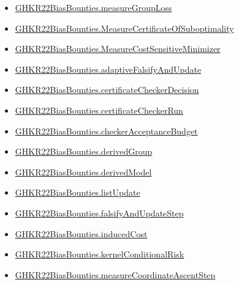 \documentclass[10pt]{article}
\begin{document}
\begin{itemize}[leftmargin=1.2em]
\begin{itemize}[leftmargin=1.2em]
\item \hyperlink{paper-prerequisite-c9cff6ba9100bf1c}{GHKR22\allowbreak{}Bias\allowbreak{}Bounties.\allowbreak{}measure\allowbreak{}Group\allowbreak{}Loss}
\item \hyperlink{paper-prerequisite-ad05480b2c897936}{GHKR22\allowbreak{}Bias\allowbreak{}Bounties.\allowbreak{}Measure\allowbreak{}Certificate\allowbreak{}Of\allowbreak{}Suboptimality}
\item \hyperlink{paper-prerequisite-3fd4c7633d9c94db}{GHKR22\allowbreak{}Bias\allowbreak{}Bounties.\allowbreak{}Measure\allowbreak{}Cost\allowbreak{}Sensitive\allowbreak{}Minimizer}
\item \hyperlink{paper-prerequisite-395d5a2d5a18135c}{GHKR22\allowbreak{}Bias\allowbreak{}Bounties.\allowbreak{}adaptive\allowbreak{}Falsify\allowbreak{}And\allowbreak{}Update}
\item \hyperlink{paper-prerequisite-f66f083361731baf}{GHKR22\allowbreak{}Bias\allowbreak{}Bounties.\allowbreak{}certificate\allowbreak{}Checker\allowbreak{}Decision}
\item \hyperlink{paper-prerequisite-a454453876c4f443}{GHKR22\allowbreak{}Bias\allowbreak{}Bounties.\allowbreak{}certificate\allowbreak{}Checker\allowbreak{}Run}
\item \hyperlink{paper-prerequisite-3296eacfe5745d61}{GHKR22\allowbreak{}Bias\allowbreak{}Bounties.\allowbreak{}checker\allowbreak{}Acceptance\allowbreak{}Budget}
\item \hyperlink{paper-prerequisite-fb8517e52c6bc50a}{GHKR22\allowbreak{}Bias\allowbreak{}Bounties.\allowbreak{}derived\allowbreak{}Group}
\item \hyperlink{paper-prerequisite-c6dba3f5b5b16427}{GHKR22\allowbreak{}Bias\allowbreak{}Bounties.\allowbreak{}derived\allowbreak{}Model}
\item \hyperlink{paper-prerequisite-6c3f0056117b6991}{GHKR22\allowbreak{}Bias\allowbreak{}Bounties.\allowbreak{}list\allowbreak{}Update}
\item \hyperlink{paper-prerequisite-32af5230e4fb2a14}{GHKR22\allowbreak{}Bias\allowbreak{}Bounties.\allowbreak{}falsify\allowbreak{}And\allowbreak{}Update\allowbreak{}Step}
\item \hyperlink{paper-prerequisite-d82197198134b74d}{GHKR22\allowbreak{}Bias\allowbreak{}Bounties.\allowbreak{}induced\allowbreak{}Cost}
\item \hyperlink{paper-prerequisite-868c7eaf7196c687}{GHKR22\allowbreak{}Bias\allowbreak{}Bounties.\allowbreak{}kernel\allowbreak{}Conditional\allowbreak{}Risk}
\item \hyperlink{paper-prerequisite-7d71dd9fa6f8250a}{GHKR22\allowbreak{}Bias\allowbreak{}Bounties.\allowbreak{}measure\allowbreak{}Coordinate\allowbreak{}Ascent\allowbreak{}Step}

\end{itemize}
\end{itemize}
\end{document}
